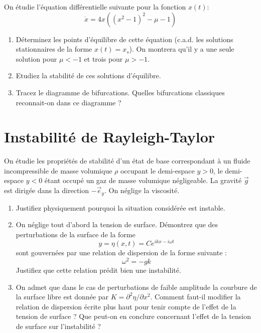 \documentclass[a4paper,11pt]{article}
\begin{document}
On étudie l'équation différentielle suivante pour la fonction $x(t)$:
$$
\dot{x}  =  4 x \left( (x^2-1)^2-\mu -1\right) 
$$

\begin{enumerate}
\item Déterminez les points d'équilibre de cette équation (c.a.d. les solutions stationnaires de la forme $x(t) = x_s$). On montrera qu'il y a une seule solution pour $\mu<-1$ et trois pour $\mu>-1$.

\item Etudiez la stabilité de ces solutions d'équilibre.

\item Tracez le diagramme de bifurcations. Quelles bifurcations classiques reconnait-on dans ce diagramme ?

\end{enumerate}


\section{Instabilité de Rayleigh-Taylor}

On étudie les propriétés de stabilité d'un état de base correspondant à un fluide incompressible de masse volumique $\rho$ occupant le demi-espace $y>0$, le demi-espace $y<0$ étant occupé un gaz de masse volumique négligeable. La gravité $\vec g$ est dirigée dans la direction $-\vec{e}_y$. On néglige la viscosité.


\begin{enumerate}

\item Justifiez physiquement pourquoi la situation considérée est instable.

\item On néglige tout d'abord la tension de surface. Démontrez que des perturbations de la 
surface de la forme 
$$
y = \eta(x,t) = C e^{i kx - i \omega t}
$$  sont gouvernées par une relation de dispersion de la forme suivante : 
$$\omega^2 = -gk$$ 
Justifiez que cette relation prédit bien une instabilité.

\item On admet que dans le cas de perturbations de faible amplitude la courbure de la surface libre est donnée par $K = \partial^2 \eta / \partial x^2$.
Comment faut-il modifier la relation de dispersion écrite plus haut pour tenir compte de l'effet de la tension de surface ?
Que peut-on en conclure concernant l'effet de la tension de surface sur l'instabilité ?

\end{enumerate}
\end{document}
